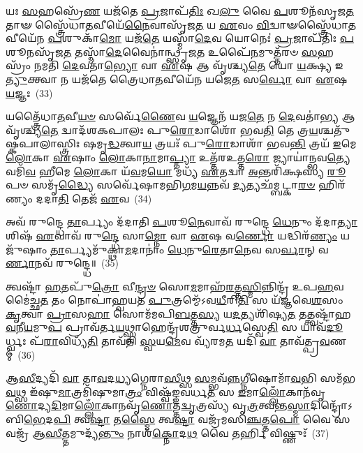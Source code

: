 𑌯𑌃 \ul{𑌸}\-𑌹𑌸𑍍𑌰𑍇᳴\-\ul{𑌣} 𑌯𑌜᳴𑌤𑍇 \ul{𑌪𑍍𑌰}\-𑌜𑌾𑌪᳴\-\ul{𑌤𑌿𑌃} 𑌖\-\ul{𑌲𑍁} 𑌵𑍈 \ul{𑌪}\-𑌶𑍂𑌨᳴𑌸𑍃𑌜\-\ul{𑌤} 𑌤𑌾𑍟 𑌸𑍍𑌤𑍍𑌰𑍈᳴𑌧𑌾\-\ul{𑌤}\-𑌵𑍀𑌯𑍇᳴\-\ul{𑌨𑍈}\-𑌵𑌾𑌸𑍃᳴𑌜\-\ul{𑌤} 𑌯 \ul{𑌏}\-𑌵𑌂 \ul{𑌵𑌿}\-𑌦𑍍𑌵𑌾𑍟𑌸𑍍𑌤𑍍𑌰𑍈᳴𑌧𑌾\-\ul{𑌤}\-𑌵𑍀𑌯𑍇᳴𑌨 \ul{𑌪}\-𑌶𑍁𑌕𑌾᳴\-\ul{𑌮𑍋} 𑌯𑌜᳴\-\ul{𑌤𑍇} 𑌯𑌸𑍍𑌮𑌾᳴\-\ul{𑌦𑍇}\-𑌵 𑌯𑍋𑌨𑍇𑌃॑ \ul{𑌪𑍍𑌰}\-𑌜𑌾𑌪᳴𑌤𑌿𑌃 \ul{𑌪}\-𑌶𑍂𑌨𑌸𑍃᳴𑌜\-\ul{𑌤} 𑌤𑌸𑍍𑌮𑌾᳴\-\ul{𑌦𑍇}\-𑌵𑍈𑌨𑌾॑𑌨𑍍𑌥𑍍𑌸𑍃𑌜\-\ul{𑌤} 𑌉𑌪𑍈᳴\-\ul{𑌨}\-𑌮𑍁𑌤𑍍𑌤᳴𑌰𑍞 \ul{𑌸}\-𑌹𑌸𑍍𑌰𑌂᳴ 𑌨𑌮𑌤𑌿 \ul{𑌦𑍇}\-𑌵𑌤𑌾॑\-\ul{𑌭𑍍𑌯𑍋} 𑌵𑌾 \ul{𑌏}\-𑌷 𑌆 𑌵𑍃᳴𑌶𑍍𑌚𑍍𑌯\-\ul{𑌤𑍇} 𑌯𑍋 \ul{𑌯}\-𑌕𑍍𑌷𑍍𑌯 𑌇\-\ul{𑌤𑍍𑌯𑍁}\-𑌕𑍍𑌤𑍍𑌵𑌾 𑌨 𑌯𑌜᳴𑌤𑍇 𑌤𑍍𑌰𑍈𑌧𑌾\-\ul{𑌤}\-𑌵𑍀𑌯𑍇᳴𑌨 𑌯𑌜𑍇\-\ul{𑌤} 𑌸\-\ul{𑌰𑍍𑌵𑍋} 𑌵𑌾 \ul{𑌏}\-𑌷 \ul{𑌯}\-𑌜𑍍𑌞𑌃~(33)

𑌯𑌤𑍍𑌤𑍍𑌰𑍈᳴𑌧𑌾\-\ul{𑌤}\-𑌵𑍀\-\ul{𑌯}\-\-\ul{𑍞} 𑌸𑌰𑍍𑌵𑍇᳴\-\ul{𑌣𑍈}\-𑌵 \ul{𑌯}\-𑌜𑍍𑌞𑍇𑌨᳴ 𑌯𑌜\-\ul{𑌤𑍇} 𑌨 \ul{𑌦𑍇}\-𑌵𑌤𑌾॑\-\ul{𑌭𑍍𑌯} 𑌆 𑌵𑍃᳴𑌶𑍍𑌚𑍍𑌯\-\ul{𑌤𑍇} 𑌦𑍍𑌵𑌾𑌦᳴𑌶\-𑌕𑌪𑌾𑌲𑌃 𑌪𑍁\-\ul{𑌰𑍋}\-𑌡𑌾𑌶𑍋᳴ 𑌭𑌵\-\ul{𑌤𑌿} 𑌤𑍇 𑌤𑍍𑌰\-\ul{𑌯}\-𑌶𑍍𑌚𑌤𑍁᳴𑌷𑍍𑌕𑌪𑌾𑌲𑌾𑌸𑍍𑌤𑍍𑌰𑌿𑌃 𑌷𑌮𑍃\-\ul{𑌦𑍍𑌧}\-𑌤𑍍𑌵𑌾\-\ul{𑌯} 𑌤𑍍𑌰𑌯𑌃᳴ 𑌪𑍁\-\ul{𑌰𑍋}\-𑌡𑌾𑌶𑌾᳴ 𑌭𑌵\-\ul{𑌨𑍍𑌤𑌿} 𑌤𑍍𑌰𑌯᳴ \ul{𑌇}\-𑌮𑍇 \ul{𑌲𑍋}\-𑌕𑌾 \ul{𑌏}\-𑌷𑌾𑌂 \ul{𑌲𑍋}\-𑌕𑌾\-\ul{𑌨𑌾}\-𑌮𑌾\-\ul{𑌪𑍍𑌤𑍍𑌯𑌾} 𑌉𑌤𑍍𑌤᳴𑌰𑌉𑌤𑍍𑌤\-\ul{𑌰𑍋} 𑌜𑍍𑌯𑌾𑌯𑌾॑𑌨𑍍𑌭𑌵\-\ul{𑌤𑍍𑌯𑍇}\-𑌵𑌮𑌿᳴\-\ul{𑌵} 𑌹𑍀𑌮𑍇 \ul{𑌲𑍋}\-𑌕𑌾 𑌯᳴\-\ul{𑌵}\-𑌮\-\ul{𑌯𑍋} 𑌮𑌧𑍍𑌯᳴ \ul{𑌏}\-𑌤𑌦𑍍𑌵𑌾 \ul{𑌅}\-𑌨𑍍𑌤𑌰𑌿᳴𑌕𑍍𑌷𑌸𑍍𑌯 \ul{𑌰𑍂}\-𑌪𑍞 𑌸𑌮𑍃᳴\-\ul{𑌦𑍍𑌧𑍍𑌯𑍈} 𑌸𑌰𑍍𑌵𑍇᳴𑌷𑌾𑌮𑌭𑌿\-\ul{𑌗}\-𑌮\-\ul{𑌯}\-𑌨𑍍𑌨𑌵᳴ \ul{𑌦𑍍𑌯}\-𑌤𑍍𑌯𑌛᳴𑌮𑍍𑌬𑌟𑍍𑌕𑌾\-\ul{𑌰}\-\-\ul{𑍞} 𑌹𑌿𑌰᳴𑌣𑍍𑌯𑌂 𑌦𑌦𑌾\-\ul{𑌤𑌿} 𑌤𑍇𑌜᳴ \ul{𑌏}\-𑌵~(34)

𑌅𑌵᳴ 𑌰𑍁𑌨𑍍𑌦𑍍𑌧𑍇 \ul{𑌤𑌾}\-𑌰𑍍𑌪𑍍𑌯𑌂 𑌦᳴𑌦𑌾𑌤𑌿 \ul{𑌪}\-𑌶𑍂\-\ul{𑌨𑍇}\-𑌵𑌾𑌵᳴ 𑌰𑍁𑌨𑍍𑌦𑍍𑌧𑍇 \ul{𑌧𑍇}\-𑌨𑍁𑌂 𑌦᳴𑌦𑌾\-\ul{𑌤𑍍𑌯𑌾}\-𑌶𑌿𑌷᳴ \ul{𑌏}\-𑌵𑌾𑌵᳴ 𑌰𑍁\-\ul{𑌨𑍍𑌦𑍍𑌧𑍇} 𑌸𑌾\-\ul{𑌮𑍍𑌨𑍋} 𑌵𑌾 \ul{𑌏}\-𑌷 𑌵\-\ul{𑌰𑍍𑌣𑍋} 𑌯𑌦𑍍𑌧𑌿𑌰᳴\-\ul{𑌣𑍍𑌯𑌂} 𑌯𑌜𑍁᳴𑌷𑌾𑌂 \ul{𑌤𑌾}\-𑌰𑍍𑌪𑍍𑌯𑌮𑍁᳴𑌕𑍍𑌥𑌾\-\ul{𑌮}\-𑌦𑌾𑌨𑌾𑌂॑ \ul{𑌧𑍇}\-𑌨𑍁\-\ul{𑌰𑍇}\-𑌤𑌾\-\ul{𑌨𑍇}\-𑌵 𑌸\-\ul{𑌰𑍍𑌵𑌾}\-𑌨𑍍 𑌵\-\ul{𑌰𑍍𑌣𑌾}\-𑌨𑌵᳴ 𑌰𑍁𑌨𑍍𑌦𑍍𑌧𑍇॥~(35)

{\anuvakamend[{𑌜𑌗᳴𑌤𑍍𑌯𑌾\-𑌽\-\ul{𑌭𑌿}\-𑌚\-\ul{𑌰}\-𑌨𑍍𑌥𑍍𑌸\-\ul{𑌰𑍍𑌵𑍋} 𑌵𑍈 𑌗᳴𑌚𑍍𑌛𑌤𑌿 \ul{𑌯}\-𑌜𑍍𑌞𑌸𑍍𑌤𑍇𑌜᳴ \ul{𑌏}\-𑌵 \ul{𑌤𑍍𑌰𑌿}\-\-\ul{𑍞}\-𑌶𑌚𑍍𑌚᳴}]}%

𑌤𑍍𑌵𑌷𑍍𑌟𑌾᳴ \ul{𑌹}\-𑌤𑌪𑍁᳴\-\ul{𑌤𑍍𑌰𑍋} 𑌵𑍀\-\ul{𑌨𑍍𑌦𑍍𑌰}\-\-\ul{𑍞} 𑌸𑍋\-\ul{𑌮}\-𑌮𑌾𑌹᳴\-\ul{𑌰}\-𑌤𑍍𑌤\-\ul{𑌸𑍍𑌮𑌿}\-𑌨𑍍𑌨𑌿𑌨𑍍𑌦𑍍𑌰᳴ 𑌉𑌪\-\ul{𑌹}\-𑌵𑌮𑍈॑𑌚𑍍𑌛\-\ul{𑌤} 𑌤𑌂 𑌨𑍋𑌪𑌾॑𑌹𑍍𑌵𑌯𑌤 \ul{𑌪𑍁}\-𑌤𑍍𑌰𑌮𑍍𑌮𑍇᳴\-𑌽𑌵\-\ul{𑌧𑍀}\-𑌰𑌿\-\ul{𑌤𑌿} 𑌸 𑌯᳴𑌜𑍍𑌞𑌵𑍇\-\ul{𑌶}\-𑌸𑌂 \ul{𑌕𑍃}\-𑌤𑍍𑌵𑌾 \ul{𑌪𑍍𑌰𑌾}\-𑌸\-\ul{𑌹𑌾} 𑌸𑍋𑌮᳴𑌮𑌪𑌿\-\ul{𑌬}\-𑌤𑍍𑌤\-\ul{𑌸𑍍𑌯} 𑌯\-\ul{𑌦}\-𑌤𑍍𑌯𑌶𑌿᳴𑌷𑍍𑌯\-\ul{𑌤} 𑌤𑌤𑍍𑌤𑍍𑌵𑌷𑍍𑌟𑌾᳴𑌹\-\ul{𑌵}\-𑌨𑍀\-\ul{𑌯}\-𑌮𑍁\-\ul{𑌪} 𑌪𑍍𑌰𑌾𑌵᳴𑌰𑍍𑌤\-\ul{𑌯}\-𑌥𑍍𑌸𑍍𑌵𑌾𑌹𑍇𑌨𑍍𑌦𑍍𑌰᳴𑌶𑌤𑍍𑌰𑍁𑌰𑍍𑌵\-\ul{𑌰𑍍𑌧}\-𑌸𑍍𑌵𑍇\-\ul{𑌤𑌿} 𑌸 𑌯𑌾𑌵᳴\-\ul{𑌦𑍂}\-𑌰𑍍𑌧𑍍𑌵𑌃 𑌪᳴\-\ul{𑌰𑌾}\-𑌵𑌿𑌧𑍍𑌯᳴\-\ul{𑌤𑌿} 𑌤𑌾𑌵᳴𑌤𑌿 \ul{𑌸𑍍𑌵}\-𑌯\-\ul{𑌮𑍇}\-𑌵 𑌵𑍍𑌯᳴𑌰𑌮\-\ul{𑌤} 𑌯𑌦𑌿᳴ \ul{𑌵𑌾} 𑌤𑌾𑌵᳴𑌤𑍍𑌪𑍍𑌰\-\ul{𑌵}\-𑌣𑌮𑍍~(36)

𑌆\-\ul{𑌸𑍀}\-𑌦𑍍𑌯𑌦𑌿᳴ \ul{𑌵𑌾} 𑌤𑌾\-\ul{𑌵}\-𑌦\-\ul{𑌧𑍍𑌯}\-𑌗𑍍𑌨𑍇𑌰𑌾\-\ul{𑌸𑍀}\-𑌥𑍍𑌸 \ul{𑌸}\-𑌮𑍍𑌭𑌵᳴\-\ul{𑌨𑍍𑌨}\-𑌗𑍍𑌨𑍀𑌷𑍋𑌮𑌾᳴\-\ul{𑌵}\-𑌭𑌿 𑌸𑌮᳴𑌭\-\ul{𑌵}\-𑌥𑍍𑌸 𑌇᳴𑌷𑍁\-\ul{𑌮𑌾}\-𑌤𑍍𑌰𑌮𑌿᳴𑌷𑍁𑌮𑌾\-\ul{𑌤𑍍𑌰𑌂} 𑌵𑌿𑌷𑍍𑌵᳴𑌙𑍍𑌙𑌵𑌰𑍍𑌧\-\ul{𑌤} 𑌸 \ul{𑌇}\-𑌮𑌾\-\ul{𑌲𑍍𑌲𑍋𑌁}\-𑌕𑌾𑌨᳴𑌵𑍃\-\ul{𑌣𑍋}\-𑌦𑍍𑌯\-\ul{𑌦𑌿}\-𑌮𑌾\-\ul{𑌲𑍍𑌲𑍋𑌁}\-𑌕𑌾𑌨𑌵𑍃᳴\-\ul{𑌣𑍋}\-𑌤𑍍𑌤\-\ul{𑌦𑍍𑌵𑍃}\-𑌤𑍍𑌰𑌸𑍍𑌯᳴ 𑌵𑍃\-\ul{𑌤𑍍𑌰}\-𑌤𑍍𑌵𑌨𑍍𑌤\-\ul{𑌸𑍍𑌮𑌾}\-𑌦𑌿𑌨𑍍𑌦𑍍𑌰𑍋᳴\-𑌽𑌬𑌿\-\ul{𑌭𑍇}\-𑌦\-\ul{𑌪𑌿} 𑌤𑍍𑌵\-\ul{𑌷𑍍𑌟𑌾} 𑌤\-\ul{𑌸𑍍𑌮𑍈} 𑌤𑍍𑌵\-\ul{𑌷𑍍𑌟𑌾} 𑌵𑌜𑍍𑌰᳴𑌮𑌸𑌿\-\ul{𑌞𑍍𑌚}\-𑌤𑍍𑌤\-\ul{𑌪𑍋} 𑌵𑍈 𑌸 𑌵𑌜𑍍𑌰᳴ 𑌆\-\ul{𑌸𑍀}\-𑌤𑍍𑌤𑌮𑍁𑌦𑍍𑌯᳴\-\ul{𑌨𑍍𑌤𑍁𑌂} 𑌨𑌾𑌶᳴\-\ul{𑌕𑍍𑌨𑍋}\-𑌦\-\ul{𑌥} 𑌵𑍈 𑌤𑌰𑍍\mbox{}\-\ul{𑌹𑌿} 𑌵𑌿𑌷𑍍𑌣𑍁𑌃᳴~(37)

